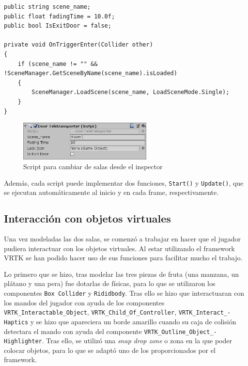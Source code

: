 \begin{lstlisting}[caption=Fragmento del script para viajar entre salas, label=lst:viajar-salas]
public string scene_name;
public float fadingTime = 10.0f;
public bool IsExitDoor = false;
    
private void OnTriggerEnter(Collider other)
{
    if (scene_name != "" && !SceneManager.GetSceneByName(scene_name).isLoaded)
    {
        SceneManager.LoadScene(scene_name, LoadSceneMode.Single);
    }
}
\end{lstlisting}

\begin{figure}[!h]
\begin{center}
\includegraphics[width=0.6\textwidth]{imagenes/7/door-teleporter-inspector.jpg}
\caption{Script para cambiar de salas desde el inspector}
\label{fig:door-teleporter-inspector}
\end{center}
\end{figure}

Además, cada script puede implementar dos funciones, \texttt{Start()} y \texttt{Update()}, que se ejecutan automáticamente al inicio y en cada frame, respectivamente.

\subsection{Interacción con objetos virtuales}

Una vez modeladas las dos salas, se comenzó a trabajar en hacer que el jugador pudiera interactuar con los objetos virtuales. Al estar utilizando el framework \acs{VRTK} se han podido hacer uso de sus funciones para facilitar mucho el trabajo.

Lo primero que se hizo, tras modelar las tres piezas de fruta (una manzana, un plátano y una pera) fue dotarlas de físicas, para lo que se utilizaron los componentes \texttt{Box Collider} y \texttt{Rididbody}. Tras ello se hizo que interactuaran con los mandos del jugador con ayuda de los componentes \texttt{VRTK\_Interactable\_Object}, \texttt{VRTK\_Child\_Of\_Controller}, \texttt{VRTK\_Interact\_-} \texttt{Haptics} y se hizo que apareciera un borde amarillo cuando su caja de colisión detectara el mando con ayuda del componente \texttt{VRTK\_Outline\_Object\_-} \texttt{Highlighter}. Tras ello, se utilizó una \textit{snap drop zone} o zona en la que poder colocar objetos, para lo que se adaptó uno de los proporcionados por el framework.

